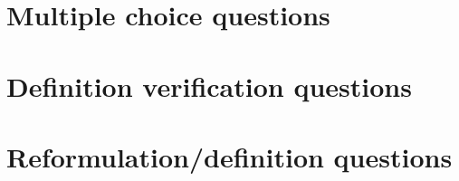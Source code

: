 \documentclass[paper=8.125in:10.250in,pagesize=pdftex,
    headinclude=false,footinclude=false,oneside,egregdoesnotlikesansseriftitles]{kaobook}
\begin{document}
\newpage

\section{Multiple choice questions}


\section{Definition verification questions}

%
%
%
%
%

\section{Reformulation/definition questions}

%
\end{document}
